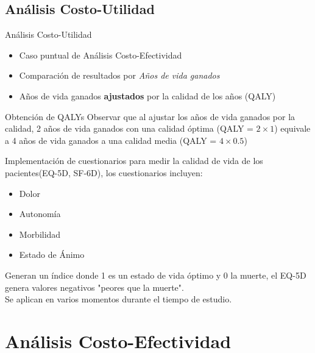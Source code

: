 \documentclass[xcolor=dvipsnames]{beamer}
\begin{document}
 \subsection{Análisis Costo-Utilidad}

 \begin{frame}{Análisis Costo-Utilidad}
    \begin{itemize}
        \item Caso puntual de Análisis Costo-Efectividad
        \item Comparación de resultados por \textit{Años de vida ganados}
        \item Años de vida ganados \textbf{ajustados} por la calidad de los años (QALY)
    \end{itemize}
    
 \end{frame}

\begin{frame}{Obtención de QALYs}
    Observar que al ajustar los años de vida ganados por la calidad, 2 años de vida ganados con una calidad óptima (QALY = $2\times1$) equivale a 4 años de vida ganados a una calidad media (QALY = $4\times0.5$)

    Implementación de cuestionarios para medir la calidad de vida de los pacientes(EQ-5D, SF-6D), los cuestionarios incluyen:
    \begin{itemize}
        \item Dolor
        \item Autonomía
        \item Morbilidad
        \item Estado de Ánimo
    \end{itemize}
Generan un índice donde 1 es un estado de vida óptimo y 0 la muerte, el EQ-5D genera valores negativos "peores que la muerte".\\
Se aplican en varios momentos durante el tiempo de estudio.
\end{frame}

\section{Análisis Costo-Efectividad}
\end{document}
